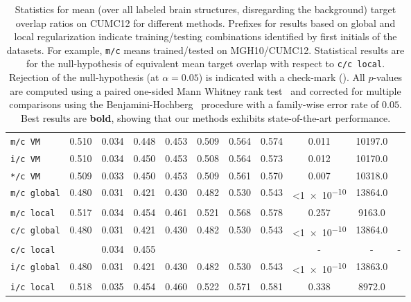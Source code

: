 \documentclass[10pt,twocolumn,letterpaper,table]{article}
\newcommand{\cmark}{\ding{51}}\newcommand{\xmark}{\ding{55}}
\numberwithin{equation}{section}
\theoremstyle{plain}
\theoremstyle{definition}
\begin{document}
\begin{table}
\begin{tiny}
{{\begin{tabular}{| l | c | c | c | c | c | c | c | c | c | c |}
			  \texttt{m/c VM} & 0.510 & 0.034 & 0.448 & 0.453 & 0.509 & 0.564 & 0.574 & 0.011 & 10197.0 & \cmark \\
			  \texttt{i/c VM} & 0.510 & 0.034 & 0.450 & 0.453 & 0.508 & 0.564 & 0.573 & 0.012 & 10170.0 & \cmark \\
			  \texttt{*/c VM} & 0.509 & 0.033 & 0.450 & 0.453 & 0.509 & 0.561 & 0.570 & 0.007 & 10318.0 & \cmark \\ \hline\hline
			  \texttt{m/c global} & 0.480 & 0.031 & 0.421 & 0.430 & 0.482 & 0.530 & 0.543 & \textless\num{1e-10} & 13864.0 & \cmark \\
			  \texttt{m/c local} & 0.517 & 0.034 & 0.454 & 0.461 & 0.521 & 0.568 & 0.578 & 0.257 & 9163.0 & \xmark \\ \hline\hline
			  \texttt{c/c global} & 0.480 & 0.031 & 0.421 & 0.430 & 0.482 & 0.530 & 0.543 & \textless\num{1e-10} & 13864.0 & \cmark \\
			  \texttt{c/c local} &  \cellcolor{green!30}{\bf 0.520} & 0.034 & 0.455 &  \cellcolor{green!30}{\bf 0.463} &  \cellcolor{green!30}{\bf 0.524} &  \cellcolor{green!30}{\bf 0.572} &  \cellcolor{green!30}{\bf 0.581} & - & - & - \\ \hline\hline
			  \texttt{i/c global} & 0.480 & 0.031 & 0.421 & 0.430 & 0.482 & 0.530 & 0.543 & \textless\num{1e-10} & 13863.0 & \cmark \\
			  \texttt{i/c local} & 0.518 & 0.035 & 0.454 & 0.460 & 0.522 & 0.571 & 0.581 & 0.338 & 8972.0 & \xmark \\
			\hline
		\end{tabular}
}}
  \caption{Statistics for mean (over all labeled brain structures, disregarding the background) target overlap ratios on CUMC12 for different methods. Prefixes for results based on global and local regularization indicate training/testing combinations identified by first initials of the datasets. For example, \texttt{m/c} means trained/tested on MGH10/CUMC12. Statistical results are for the null-hypothesis of equivalent mean target overlap with respect to \texttt{c/c local}. Rejection of the null-hypothesis (at $\alpha=0.05$) is indicated with a check-mark (\cmark). All $p$-values are computed using a paired one-sided Mann Whitney rank test~\cite{mann1947} and corrected for multiple comparisons using the Benjamini-Hochberg~\cite{benjamini1995} procedure with a family-wise error rate of $0.05$. Best results are \textbf{bold}, showing that our methods exhibits state-of-the-art performance.}
        \label{tab:target_overlap_3d_cumc12}
\end{tiny}
\end{table}
\end{document}
